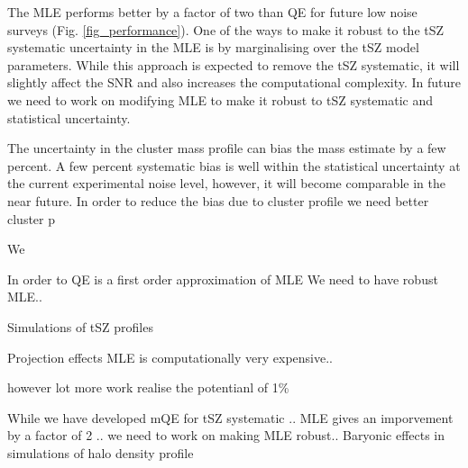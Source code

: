 The MLE performs better by a factor of two than QE for future low noise surveys (Fig. \ref{fig_performance}). 
One of the ways to make it robust to the tSZ systematic uncertainty in the MLE is by marginalising over the tSZ model parameters. 
While this approach is expected to remove the tSZ systematic, it will slightly affect the SNR and also increases the computational complexity. 
In future we need to work on modifying MLE to make it robust to tSZ systematic and statistical uncertainty. %

The uncertainty in the cluster mass profile can bias the mass estimate by a few percent. 
A few percent systematic bias is well within the statistical uncertainty at the current experimental noise level, however, it will become comparable in the near future. 
In order to reduce the bias due to cluster profile we need better cluster p

We 




In order to 
QE is a first order approximation of MLE
We need to have robust MLE..

Simulations of tSZ profiles

Projection effects
MLE is computationally very expensive.. 

however lot more work realise the potentianl of 1\% 

While we have developed mQE for tSZ systematic ..
MLE gives an imporvement by a factor of 2 ..
we need to work on making MLE robust.. 
Baryonic effects in simulations of halo density profile


